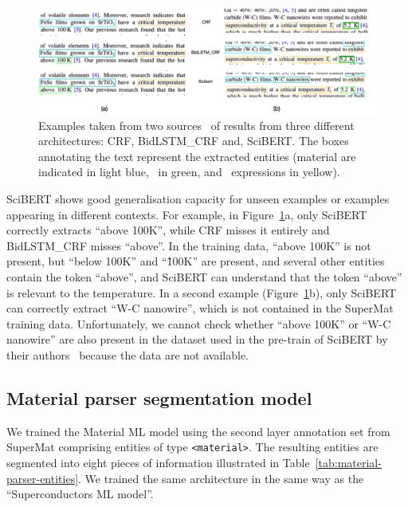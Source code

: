 \begin{figure}[htbp]
    \centering
    \includegraphics[width=\textwidth]{figures/automatic_extraction_supercon/example-comparison-archs.png}
    \caption{Examples taken from two sources~\cite{Gajda_2016, Shibata_2016} of results from three different architectures: CRF, BidLSTM\_CRF and, SciBERT. The boxes annotating the text represent the extracted entities (material are indicated in light blue, \tc~in green, and \tc~expressions in yellow).}
    \label{fig:example-comparison-architectures}
\end{figure}

SciBERT shows good generalisation capacity for unseen examples or examples appearing in different contexts.
For example, in Figure~\ref{fig:example-comparison-architectures}a, only SciBERT correctly extracts ``above 100K'', while CRF misses it entirely and BidLSTM\_CRF misses ``above''.
In the training data, ``above 100K'' is not present, but ``below 100K'' and ``\~100K'' are present, and several other entities contain the token ``above'', and SciBERT can understand that the token ``above'' is relevant to the temperature.
In a second example (Figure~\ref{fig:example-comparison-architectures}b), only SciBERT can correctly extract ``W-C nanowire'', which is not contained in the SuperMat training data.
Unfortunately, we cannot check whether ``above 100K'' or ``W-C nanowire'' are also present in the dataset used in the pre-train of SciBERT by their authors~\cite{Beltagy2019SciBERT} because the data are not available.


\subsection{Material parser segmentation model}

We trained the Material ML model using the second layer annotation set from SuperMat comprising entities of type \texttt{<material>}.
The resulting entities are segmented into eight pieces of information illustrated in Table~\ref{tab:material-parser-entities}.
We trained the same architecture in the same way as the ``Superconductors ML model''.

